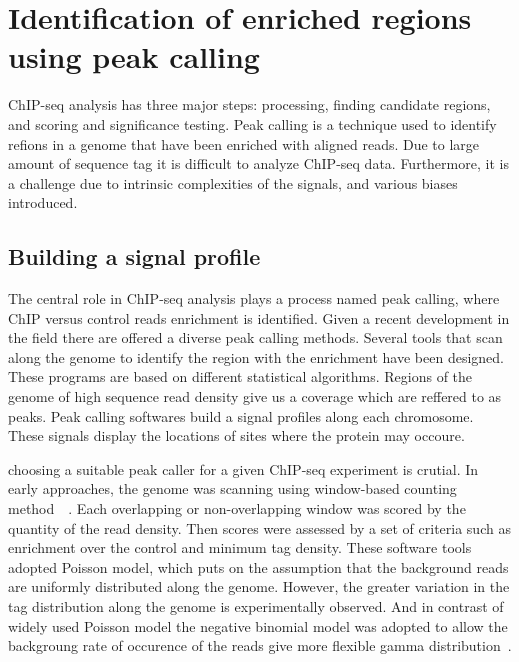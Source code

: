 \chapter{Identification of enriched regions using peak calling}

ChIP-seq analysis has three major steps: processing, finding candidate regions, and scoring and significance testing.
Peak calling is a technique used to identify refions in a genome that have been enriched with aligned reads.
Due to large amount of sequence tag it is difficult to analyze ChIP-seq data.
Furthermore, it is a challenge due to intrinsic complexities of the signals, and various biases introduced.




\section{Building a signal profile}

The central role in ChIP-seq analysis plays a process named peak calling, where ChIP versus control reads enrichment is identified.
Given a recent development in the field there are offered a diverse peak calling methods.
Several tools that scan along the genome to identify the region with the enrichment have been designed.
These programs are based on different statistical algorithms.
Regions of the genome of high sequence read density give us a coverage which are reffered to as peaks.
Peak calling softwares build a signal profiles along each chromosome.
These signals display the locations of sites where the protein may occoure.

choosing a suitable peak caller for a given ChIP-seq experiment is crutial.
In early approaches, the genome was scanning using window-based counting method~\cite{Zang-2009}~\cite{Xu-2010}.
Each overlapping or non-overlapping window was scored by the quantity of the read density. 
Then scores were assessed by a set of criteria such as enrichment over the control and minimum tag density.
These software tools adopted Poisson model, which puts on the assumption that the background reads are uniformly distributed along the genome.
However, the greater variation in the tag distribution along the genome is experimentally observed.
And in contrast of widely used Poisson model the negative binomial model was adopted to allow the backgroung rate of occurence of the reads give more flexible gamma distribution~\cite{ji2008integrated}.

